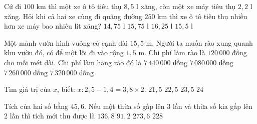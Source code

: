 \begin{ex} %
Cứ đi $100\text{ km}$ thì một xe ô tô tiêu thụ $8{,}5\text{ l}$ xăng, còn một xe máy tiêu thụ $2{,}2\text{ l}$ xăng. Hỏi khi cả hai xe cùng đi quãng đường $250\text{ km}$ thì xe ô tô tiêu thụ nhiều hơn xe máy bao nhiêu lít xăng?
\choice
{$14{,}75\text{ l}$}
{\True $15{,}75\text{ l}$}
{$16{,}25\text{ l}$}
{$15{,}5\text{ l}$}
\end{ex}

\begin{ex} %
Một mảnh vườn hình vuông có cạnh dài $15{,}5\text{ m}$. Người ta muốn rào xung quanh khu vườn đó, có để một lối đi vào rộng $1{,}5\text{ m}$. Chi phí làm rào là $120\,000$ đồng cho mỗi mét dài. Chi phí làm hàng rào đó là
\choice
{$7\,440\,000\text{ đồng}$}
{$7\,080\,000\text{ đồng}$}
{\True $7\,260\,000\text{ đồng}$}
{$7\,320\,000\text{ đồng}$}
\end{ex}

\begin{ex} %
Tìm giá trị của $x$, biết: $x : 2{,}5 - 1{,}4 = 3{,}8 \times 2$.
\choice
{$21{,}5$}
{\True $22{,}5$}
{$23{,}5$}
{$24$}
\end{ex}

\begin{ex} %
Tích của hai số bằng $45{,}6$. Nếu một thừa số gấp lên 3 lần và thừa số kia gấp lên 2 lần thì tích mới thu được là
\choice
{$136{,}8$}
{$91{,}2$}
{\True $273{,}6$}
{$228$}
\end{ex}

